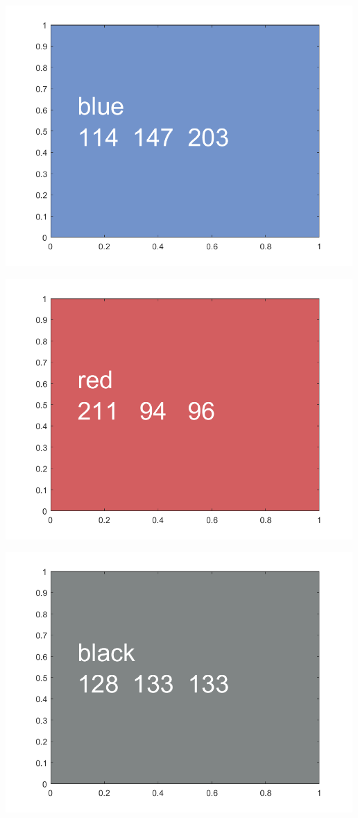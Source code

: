 \documentclass[
]{book}
\begin{document}
\includegraphics[width=5.20833in,height=\textheight]{img/fs_color_images/figure_6.png}

\includegraphics[width=5.20833in,height=\textheight]{img/fs_color_images/figure_7.png}

\includegraphics[width=5.20833in,height=\textheight]{img/fs_color_images/figure_8.png}
\end{document}
